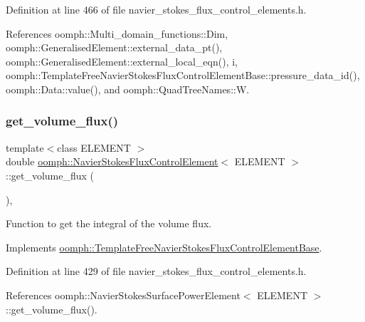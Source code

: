 Definition at line 466 of file navier\+\_\+stokes\+\_\+flux\+\_\+control\+\_\+elements.\+h.



References oomph\+::\+Multi\+\_\+domain\+\_\+functions\+::\+Dim, oomph\+::\+Generalised\+Element\+::external\+\_\+data\+\_\+pt(), oomph\+::\+Generalised\+Element\+::external\+\_\+local\+\_\+eqn(), i, oomph\+::\+Template\+Free\+Navier\+Stokes\+Flux\+Control\+Element\+Base\+::pressure\+\_\+data\+\_\+id(), oomph\+::\+Data\+::value(), and oomph\+::\+Quad\+Tree\+Names\+::W.

\mbox{\label{classoomph_1_1NavierStokesFluxControlElement_a3a2ff525c8a522dff91efc61c0b52a80}} 
\subsubsection{\texorpdfstring{get\+\_\+volume\+\_\+flux()}{get\_volume\_flux()}}
{\footnotesize\ttfamily template$<$class E\+L\+E\+M\+E\+NT $>$ \\
double \hyperlink{classoomph_1_1NavierStokesFluxControlElement}{oomph\+::\+Navier\+Stokes\+Flux\+Control\+Element}$<$ E\+L\+E\+M\+E\+NT $>$\+::get\+\_\+volume\+\_\+flux (\begin{DoxyParamCaption}{ }\end{DoxyParamCaption})\hspace{0.3cm}{\ttfamily [inline]}, {\ttfamily [virtual]}}



Function to get the integral of the volume flux. 



Implements \hyperlink{classoomph_1_1TemplateFreeNavierStokesFluxControlElementBase_a32bc6e84461a78a1637f05f0a2e2185a}{oomph\+::\+Template\+Free\+Navier\+Stokes\+Flux\+Control\+Element\+Base}.



Definition at line 429 of file navier\+\_\+stokes\+\_\+flux\+\_\+control\+\_\+elements.\+h.



References oomph\+::\+Navier\+Stokes\+Surface\+Power\+Element$<$ E\+L\+E\+M\+E\+N\+T $>$\+::get\+\_\+volume\+\_\+flux().

